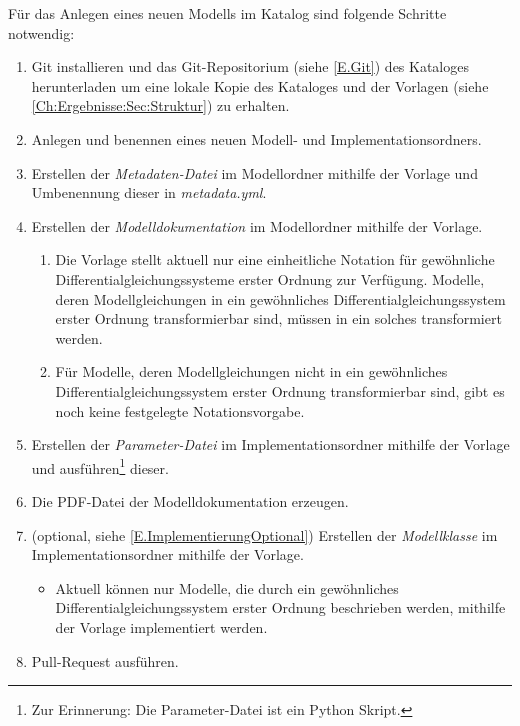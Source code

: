 Für das Anlegen eines neuen Modells im Katalog sind folgende Schritte notwendig:
\begin{enumerate}
	\item Git installieren und das Git-Repositorium (siehe \ref{E.Git}) des Kataloges herunterladen um eine lokale Kopie des Kataloges und der Vorlagen (siehe \autoref{Ch:Ergebnisse:Sec:Struktur}) zu erhalten.
	\item Anlegen und benennen eines neuen Modell- und Implementationsordners.
	\item Erstellen der \textit{Metadaten-Datei} im Modellordner mithilfe der Vorlage und Umbenennung dieser in \textit{metadata.yml}.
	\item Erstellen der \textit{Modelldokumentation} im Modellordner mithilfe der Vorlage.
	\begin{enumerate}[label=\textbf{Anmerkung \arabic*}:, wide=0pt, leftmargin=*]
		\item Die Vorlage stellt aktuell nur eine einheitliche Notation für gewöhnliche Differentialgleichungssysteme erster Ordnung zur Verfügung. Modelle, deren Modellgleichungen in ein gewöhnliches Differentialgleichungssystem erster Ordnung transformierbar sind, müssen in ein solches transformiert werden.
		\item Für Modelle, deren Modellgleichungen nicht in ein gewöhnliches Differentialgleichungssystem erster Ordnung transformierbar sind, gibt es noch keine festgelegte Notationsvorgabe.
	\end{enumerate}
	\item Erstellen der \textit{Parameter-Datei} im Implementationsordner mithilfe der Vorlage und ausführen\footnote{Zur Erinnerung: Die Parameter-Datei ist ein Python Skript.} dieser.
	\item Die PDF-Datei der Modelldokumentation erzeugen.
	\item (optional, siehe \ref{E.ImplementierungOptional}) Erstellen der \textit{Modellklasse} im Implementationsordner mithilfe der Vorlage.
	\begin{itemize}[label=\textbf{Anmerkung}:, wide=0pt, leftmargin=*]
		\item Aktuell können nur Modelle, die durch ein gewöhnliches Differentialgleichungssystem erster Ordnung beschrieben werden, mithilfe der Vorlage implementiert werden.
	\end{itemize}
	\item Pull-Request ausführen.
\end{enumerate}





